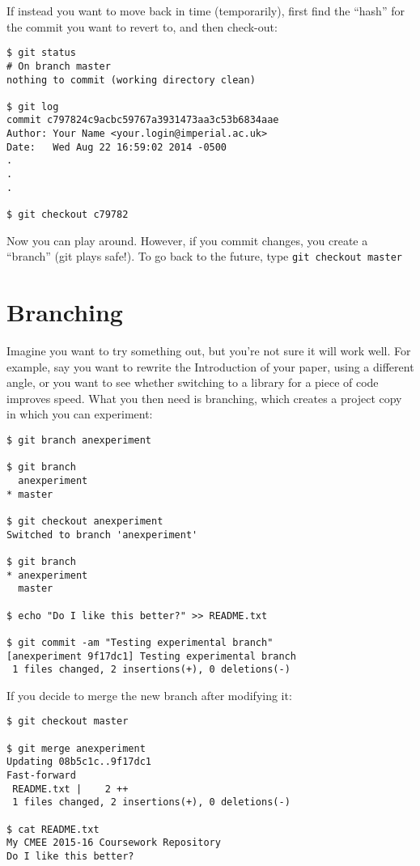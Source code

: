 If instead you want to move back in time (temporarily), first find the 
``hash'' for the commit you want to revert to, and then check-out:

\begin{lstlisting} 
$ git status
# On branch master
nothing to commit (working directory clean)

$ git log
commit c797824c9acbc59767a3931473aa3c53b6834aae
Author: Your Name <your.login@imperial.ac.uk>
Date:   Wed Aug 22 16:59:02 2014 -0500
.
.
.

$ git checkout c79782
\end{lstlisting}

Now you can play around. However, if you commit changes, you create a 
``branch'' (git plays safe!). To go back to the future, type {\tt git 
checkout master}

\section{Branching}

Imagine you want to try something out, but you're not sure it will work 
well. For example, say you want to rewrite the Introduction of your 
paper, using a different angle, or you want to see whether switching to 
a library for a piece of code improves speed. What you then need is 
branching, which creates a project copy in which you can experiment:

\begin{lstlisting} 
$ git branch anexperiment

$ git branch
  anexperiment
* master

$ git checkout anexperiment 
Switched to branch 'anexperiment'

$ git branch 
* anexperiment
  master

$ echo "Do I like this better?" >> README.txt 

$ git commit -am "Testing experimental branch"
[anexperiment 9f17dc1] Testing experimental branch
 1 files changed, 2 insertions(+), 0 deletions(-)
\end{lstlisting}
 
If you decide to merge the new branch after modifying it:

\begin{lstlisting} 
$ git checkout master

$ git merge anexperiment
Updating 08b5c1c..9f17dc1
Fast-forward
 README.txt |    2 ++
 1 files changed, 2 insertions(+), 0 deletions(-)

$ cat README.txt 
My CMEE 2015-16 Coursework Repository
Do I like this better?
\end{lstlisting}

